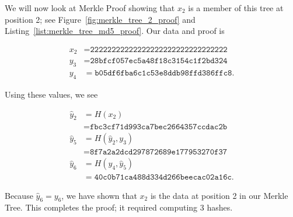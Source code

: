 \begin{example}

We will now look at Merkle Proof showing that $x_{2}$
is a member of this tree at position 2;
see Figure~\ref{fig:merkle_tree_2_proof}
and Listing~\ref{list:merkle_tree_md5_proof}.
Our data and proof is



\begin{align}
    x_{2} &= \texttt{22222222222222222222222222222222}
        \nonumber\\
    y_{3} &= \texttt{28bfcf057ec5a48f18c3154c1f2bd324}
        \nonumber\\
    y_{4} &= \texttt{b05df6fba6c1c53e8ddb98ffd386ffc8}.
\end{align}

\noindent
Using these values, we see

\begin{align}
    \hat{y}_{2} &= H(x_{2}) \nonumber\\
        &= \texttt{fbc3cf71d993ca7bec2664357ccdac2b}
            \nonumber\\
    \hat{y}_{5} &= H(\hat{y}_{2}, y_{3}) \nonumber\\
        &= \texttt{8f7a2a2dcd297872689e177953270f37}
            \nonumber\\
    \hat{y}_{6} &= H(y_{4}, \hat{y}_{5}) \nonumber\\
        &= \texttt{40c0b71ca488d334d266beecac02a16c}.
\end{align}

\noindent
Because $\hat{y}_{6} = y_{6}$, we have shown that $x_{2}$ is the data
at position 2 in our Merkle Tree.
This completes the proof;
it required computing 3 hashes.
\end{example}

